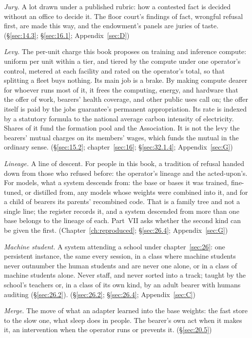 \emph{Jury.} A lot drawn under a published rubric: how a contested fact is decided without an office to decide it. The floor court's findings of fact, wrongful refusal first, are made this way, and the endowment's panels are juries of taste. (\S\ref{sec:14.3}; \S\ref{sec:16.1}; Appendix~\ref{sec:D})

\emph{Levy.} The per-unit charge this book proposes on training and inference compute: uniform per unit within a tier, and tiered by the compute under one operator's control, metered at each facility and rated on the operator's total, so that splitting a fleet buys nothing. Its main job is a brake. By making compute dearer for whoever runs most of it, it frees the computing, energy, and hardware that the offer of work, bearers' health coverage, and other public uses call on; the offer itself is paid by the jobs guarantee's permanent appropriation. Its rate is indexed by a statutory formula to the national average carbon intensity of electricity. Shares of it fund the formation pool and the Association. It is not the levy the bearers' mutual charges on its members' wages, which funds the mutual in the ordinary sense. (\S\ref{sec:15.2}; chapter~\ref{sec:16}; \S\ref{sec:32.1.4}; Appendix~\ref{sec:G})

\emph{Lineage.} A line of descent. For people in this book, a tradition of refusal handed down from those who refused before: the operator's lineage and the acted-upon's. For models, what a system descends from: the base or bases it was trained, fine-tuned, or distilled from, any models whose weights were combined into it, and for a child of bearers its parents' recombined code. That is a family tree and not a single line; the register records it, and a system descended from more than one base belongs to the lineage of each. Part~VII asks whether the second kind can be given the first. (Chapter~\ref{ch:reproduced}; \S\ref{sec:26.4}; Appendix~\ref{sec:G})

\emph{Machine student.} A system attending a school under chapter~\ref{sec:26}: one persistent instance, the same every session, in a class where machine students never outnumber the human students and are never one alone, or in a class of machine students alone. Never staff, and never sorted into a track; taught by the school's teachers or, in a class of its own kind, by an adult bearer with humans auditing (\S\ref{sec:26.2}). (\S\ref{sec:26.2}; \S\ref{sec:26.4}; Appendix~\ref{sec:C})

\emph{Merge.} The move of what an adapter learned into the base weights: the fast store to the slow one, what sleep does in people. The bearer's own act when it makes it, an intervention when the operator runs or prevents it. (\S\ref{sec:20.5})


